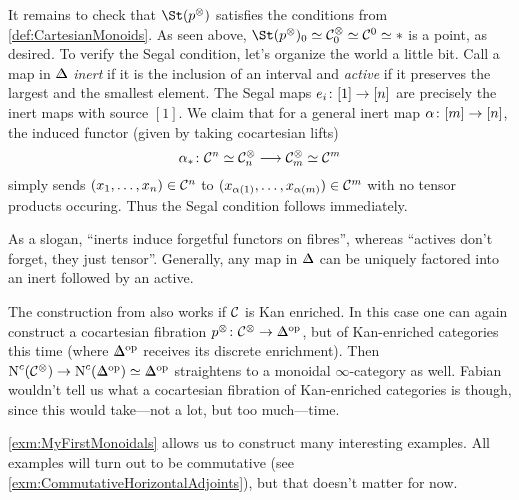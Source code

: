 \begin{exm}
\begin{alphanumerate}
		It remains to check that $\St (p^\otimes)$ satisfies the conditions from \cref{def:CartesianMonoids}. As seen above, $\St (p^\otimes)_0\simeq \Cc_0^\otimes \simeq \Cc^0\simeq *$ is a point, as desired. To verify the Segal condition, let's organize the world a little bit. Call a map in $\IDelta$ \emph{inert} if it is the inclusion of an interval and \emph{active} if it preserves the largest and the smallest element. The Segal maps $e_i\colon [1]\morphism {}[n]$ are precisely the inert maps with source $[1]$. We claim that for a general inert map $\alpha\colon [m]\morphism{[n]}$, the induced functor (given by taking cocartesian lifts) 
		\begin{equation*}
			\alpha_*\colon \Cc^n\simeq \Cc_n^\otimes \morphism \Cc_m^\otimes \simeq \Cc^m
		\end{equation*}
		simply sends $(x_1,\dotsc,x_n)\in \mathcal{C}^n$ to $(x_{\alpha(1)},\dotsc,x_{\alpha(m)})\in \mathcal{C}^m$ with no tensor products occuring. Thus the Segal condition follows immediately.
		
		As a slogan, \enquote{inerts induce forgetful functors on fibres}, whereas \enquote{actives don't forget, they just tensor}. Generally, any map in $\IDelta$ can be uniquely factored into an inert followed by an active.
		\item The construction from  also works if $\mathcal{C}$ is Kan enriched. In this case one can again construct a cocartesian fibration $p^\otimes\colon \Cc^\otimes \morphism \IDelta^\op$, but of Kan-enriched categories this time (where $\IDelta^\op$ receives its discrete enrichment). Then $\N^c(\Cc^\otimes)\morphism \N^c(\IDelta^\op)\simeq \IDelta^\op$ straightens to a monoidal $\infty$-category as well. Fabian wouldn't tell us what a cocartesian fibration of Kan-enriched categories is though, since this would take---not a lot, but too much---time.
	\end{alphanumerate}
\end{exm}
\cref{exm:MyFirstMonoidals} allows us to construct many interesting examples. All examples will turn out to be commutative (see \cref{exm:CommutativeHorizontalAdjoints}), but that doesn't matter for now.

